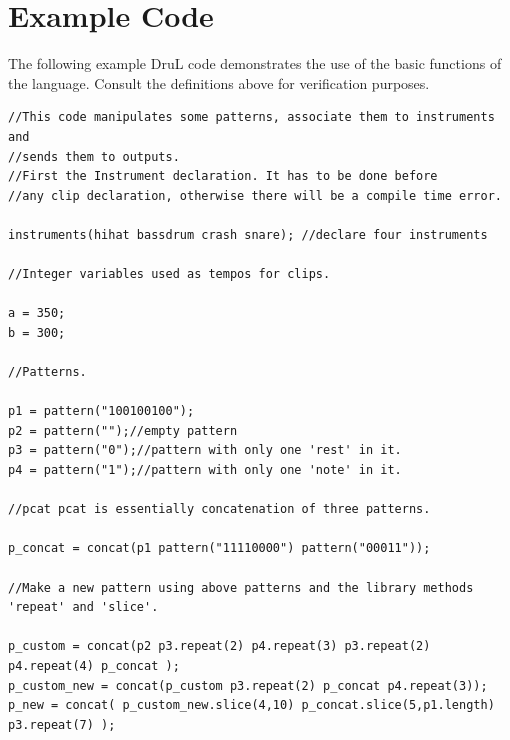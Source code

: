 \documentclass[11pt,twoside]{article}
\begin{document}
\clearpage

\section{Example Code}

The following example DruL code demonstrates the use of the basic functions of the language.
Consult the definitions above for verification purposes.

\begin{verbatim}
//This code manipulates some patterns, associate them to instruments and
//sends them to outputs.
//First the Instrument declaration. It has to be done before 
//any clip declaration, otherwise there will be a compile time error.

instruments(hihat bassdrum crash snare); //declare four instruments

//Integer variables used as tempos for clips.

a = 350;
b = 300;

//Patterns.

p1 = pattern("100100100");
p2 = pattern("");//empty pattern
p3 = pattern("0");//pattern with only one 'rest' in it.
p4 = pattern("1");//pattern with only one 'note' in it.

//pcat pcat is essentially concatenation of three patterns.

p_concat = concat(p1 pattern("11110000") pattern("00011"));

//Make a new pattern using above patterns and the library methods 'repeat' and 'slice'. 

p_custom = concat(p2 p3.repeat(2) p4.repeat(3) p3.repeat(2) p4.repeat(4) p_concat );
p_custom_new = concat(p_custom p3.repeat(2) p_concat p4.repeat(3));
p_new = concat( p_custom_new.slice(4,10) p_concat.slice(5,p1.length) p3.repeat(7) );

\end{verbatim}
\clearpage
\end{document}
